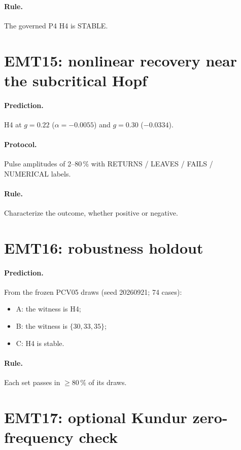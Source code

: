 \documentclass[10pt,a4paper]{article}
\begin{document}
\paragraph{Rule.} The governed P4 H4 is STABLE.

\section{EMT15: nonlinear recovery near the subcritical Hopf}

\paragraph{Prediction.} H4 at $g=0.22$ ($\alpha=-0.0055$) and $g=0.30$
($-0.0334$).

\paragraph{Protocol.} Pulse amplitudes of 2--80\,\% with RETURNS / LEAVES /
FAILS / NUMERICAL labels.

\paragraph{Rule.} Characterize the outcome, whether positive or negative.

\section{EMT16: robustness holdout}

\paragraph{Prediction.} From the frozen PCV05 draws (seed 20260921; 74 cases):
\begin{itemize}
\item A: the witness is H4;
\item B: the witness is $\{30,33,35\}$;
\item C: H4 is stable.
\end{itemize}

\paragraph{Rule.} Each set passes in $\ge80\,\%$ of its draws.

\section{EMT17: optional Kundur zero-frequency check}\label{sec:kundur}
\end{document}
